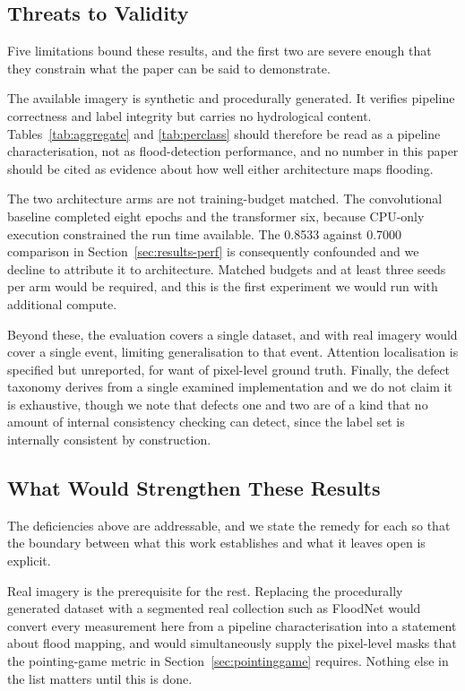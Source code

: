 \subsection{Threats to Validity}

Five limitations bound these results, and the first two are severe enough that
they constrain what the paper can be said to demonstrate.

The available imagery is synthetic and procedurally generated. It verifies
pipeline correctness and label integrity but carries no hydrological content.
Tables~\ref{tab:aggregate} and \ref{tab:perclass} should therefore be read as a
pipeline characterisation, not as flood-detection performance, and no number in
this paper should be cited as evidence about how well either architecture maps
flooding.

The two architecture arms are not training-budget matched. The convolutional
baseline completed eight epochs and the transformer six, because CPU-only
execution constrained the run time available. The 0.8533 against 0.7000
comparison in Section~\ref{sec:results-perf} is consequently confounded and we
decline to attribute it to architecture. Matched budgets and at least three
seeds per arm would be required, and this is the first experiment we would run
with additional compute.

Beyond these, the evaluation covers a single dataset, and with real imagery
would cover a single event, limiting generalisation to that event. Attention
localisation is specified but unreported, for want of pixel-level ground truth.
Finally, the defect taxonomy derives from a single examined implementation and
we do not claim it is exhaustive, though we note that defects one and two are
of a kind that no amount of internal consistency checking can detect, since the
label set is internally consistent by construction.

\subsection{What Would Strengthen These Results}

The deficiencies above are addressable, and we state the remedy for each so
that the boundary between what this work establishes and what it leaves open is
explicit.

Real imagery is the prerequisite for the rest. Replacing the procedurally
generated dataset with a segmented real collection such as FloodNet would
convert every measurement here from a pipeline characterisation into a
statement about flood mapping, and would simultaneously supply the pixel-level
masks that the pointing-game metric in Section~\ref{sec:pointinggame} requires.
Nothing else in the list matters until this is done.

